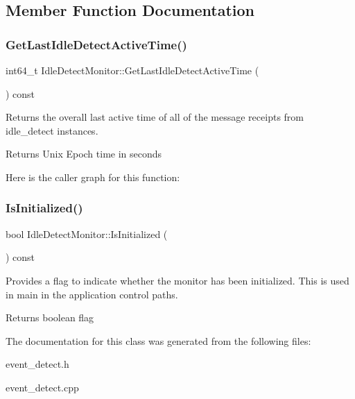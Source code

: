 \subsection{Member Function Documentation}
\mbox{\label{classEventDetect_1_1IdleDetectMonitor_acc4bec04aa1e47e5e7e7fae87cdf2b76}} 
\subsubsection{\texorpdfstring{Get\+Last\+Idle\+Detect\+Active\+Time()}{GetLastIdleDetectActiveTime()}}
{\footnotesize\ttfamily int64\+\_\+t Idle\+Detect\+Monitor\+::\+Get\+Last\+Idle\+Detect\+Active\+Time (\begin{DoxyParamCaption}{ }\end{DoxyParamCaption}) const}



Returns the overall last active time of all of the message receipts from idle\+\_\+detect instances. 

\begin{DoxyReturn}{Returns}
Unix Epoch time in seconds 
\end{DoxyReturn}
Here is the caller graph for this function\+:
\mbox{\label{classEventDetect_1_1IdleDetectMonitor_af945f0f33b8c0fe2c8ee33bd9ac83f12}} 
\subsubsection{\texorpdfstring{Is\+Initialized()}{IsInitialized()}}
{\footnotesize\ttfamily bool Idle\+Detect\+Monitor\+::\+Is\+Initialized (\begin{DoxyParamCaption}{ }\end{DoxyParamCaption}) const}



Provides a flag to indicate whether the monitor has been initialized. This is used in main in the application control paths. 

\begin{DoxyReturn}{Returns}
boolean flag 
\end{DoxyReturn}


The documentation for this class was generated from the following files\+:\begin{DoxyCompactItemize}
\item 
event\+\_\+detect.\+h\item 
event\+\_\+detect.\+cpp\end{DoxyCompactItemize}
